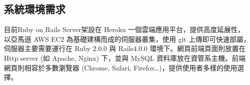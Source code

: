\documentclass[11pt]{article}
\begin{document}
\subsection{系統環境需求}
目前Ruby on Rails Server架設在 Heroku 一個雲端應用平台，提供高度延展性，以亞馬遜 AWS EC2 為基礎建構而成的伺服器叢集，使用 git 上傳即可快速部屬，伺服器主要需要運行在 Ruby 2.0.0 與 Rails4.0.0 環境下。網頁前端頁面則放置在 Http server (如 Apache, Nginx) 下，並與 MySQL 資料庫放在資管系主機。前端網頁則相容於多數瀏覽器 (Chrome, Safari, Firefox…)，提供使用者多樣的使用選擇。
\end{document}

